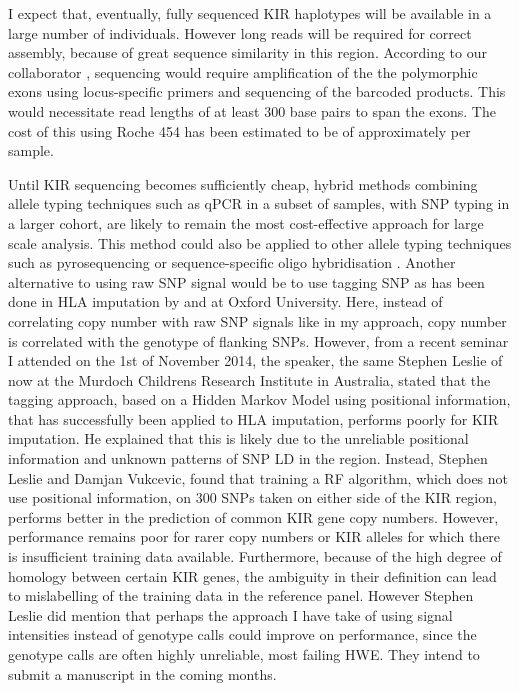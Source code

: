 I expect that, eventually, fully sequenced KIR haplotypes will be available in a large number of individuals.
However long reads will be required for correct assembly, because of great sequence similarity in this region.
According to our collaborator , sequencing would require amplification of the the polymorphic exons
using locus-specific primers and sequencing of the barcoded products.
This would necessitate read lengths of at least 300 base pairs to span the exons.
The cost of this using Roche 454 has been estimated to be of approximately  per sample.


Until KIR sequencing becomes sufficiently cheap, hybrid methods combining allele typing techniques such as qPCR
in a subset of samples, with SNP typing in a larger cohort, are likely to remain the most cost-effective approach for large scale analysis.  
This method could also be applied to other allele typing techniques such as pyrosequencing \citep{Norman:2009fi} or sequence-specific oligo hybridisation \citep{Martin:2007ik}.
Another alternative to using raw SNP signal would be to use tagging SNP as has been done in HLA imputation by \citet{Leslie:2008dq} and \cite{Dilthey:2013dn} at Oxford University.
Here, instead of correlating copy number with raw SNP signals like in my approach, copy number is correlated with the genotype of flanking SNPs.
However, from a recent seminar I attended on the 1st of November 2014, the speaker, the same Stephen Leslie of \citet{Leslie:2008dq}
now at the Murdoch Childrens Research Institute in Australia,
stated that the tagging approach, based on a Hidden Markov Model using positional information, that has successfully been applied to HLA imputation,
performs poorly for KIR imputation.  He explained that this is likely due to the unreliable positional information and unknown patterns of SNP \gls{LD} in the region.
Instead, Stephen Leslie and Damjan Vukcevic, found that
training a \acrfull{RF} algorithm, which does not use positional information, on 300 SNPs taken on either side of the KIR region,
performs better in the prediction of common KIR gene copy numbers.
However, performance remains poor for rarer copy numbers or KIR alleles for which there is 
insufficient training data available.
Furthermore, because of the high degree of homology between certain KIR genes,
the ambiguity in their definition can lead to mislabelling of the training data in the reference panel.
However Stephen Leslie did mention that perhaps the approach I have take of using signal intensities instead of genotype calls could improve on performance,
since the genotype calls are often highly unreliable, most failing \gls{HWE}.
They intend to submit a manuscript in the coming months.

